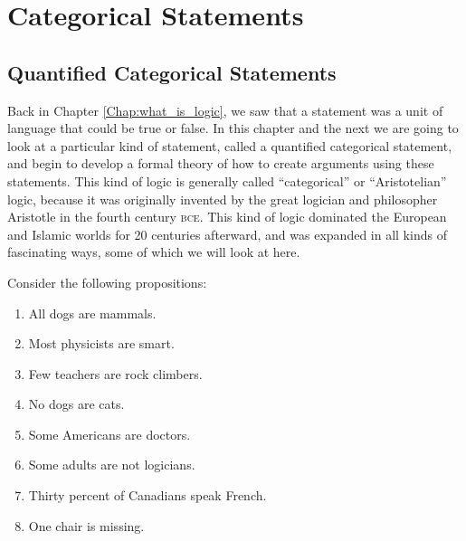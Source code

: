 \chapter{Categorical Statements}
\label{chap:catstatements}
\setlength{\parindent}{1em}


\section{Quantified Categorical Statements}
\label{sec:qcatstatements}

Back in Chapter \ref{Chap:what_is_logic}, we saw that a statement was a unit of language that could be true or false. In this chapter and the next we are going to look at a particular kind of statement, called a quantified categorical statement, and begin to develop a formal theory of how to create arguments using these statements. This kind of logic is generally called ``categorical'' or ``Aristotelian'' logic, because it was originally invented by the great logician and philosopher Aristotle in the fourth century \textsc{bce}. This kind of logic dominated the European and Islamic worlds for 20 centuries afterward, and was expanded in all kinds of fascinating ways, some of which we will look at here.
 
Consider the following propositions:

\begin{enumerate}[label=(\alph*)]
\item \label{itm:dogs} All dogs are mammals.

\item \label{itm:physicists} Most physicists are smart.

\item \label{itm:teachers} Few teachers are rock climbers.

\item \label{itm:no_dogs} No dogs are cats. 

\item \label{itm:americans} Some Americans are doctors. 

\item \label{itm:adults}Some adults are not logicians. 

\item \label{itm:canadians} Thirty percent of Canadians speak French.

\item \label{itm:chair}One chair is missing.

\end{enumerate}

